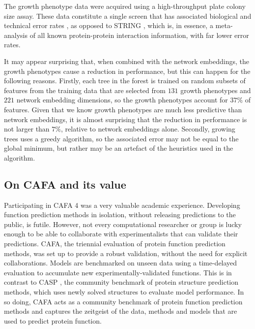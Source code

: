 The growth phenotype data were acquired using a high-throughput plate colony size assay. These data constitute a single screen that has associated biological and technical error rates \cite{Bilder2009}, as opposed to STRING \cite{Szklarczyk2019}, which is, in essence, a meta-analysis of all known protein-protein interaction information, with far lower error rates.

It may appear surprising that, when combined with the network embeddings, the growth phenotypes cause a reduction in performance, but this can happen for the following reasons. Firstly, each tree in the forest is trained on random subsets of features from the training data that are selected from $131$ growth phenotypes and $221$ network embedding dimensions,
so the growth phenotypes account for $37\%$ of features. Given that we know growth phenotypes are much less predictive than network embeddings, it is almost surprising that the reduction in performance is not larger than $7\%$, relative to network embeddings alone. Secondly, growing trees uses a greedy algorithm, so the associated error may not be equal to the global minimum, but rather may be an artefact of the heuristics used in the algorithm.

\subsection{On CAFA and its value}

Participating in CAFA 4 was a very valuable academic experience. Developing function prediction methods in isolation, without releasing predictions to the public, is futile. However, not every computational researcher or group is lucky enough to be able to collaborate with experimentalists that can validate their predictions. CAFA, the triennial evaluation of protein function prediction methods, was set up to provide a robust validation, without the need for explicit collaborations. Models are benchmarked on unseen data using a time-delayed evaluation to accumulate new experimentally-validated functions. This is in contrast to CASP \cite{Kryshtafovych2019}, the community benchmark of protein structure prediction methods, which uses newly solved structures to evaluate model performance. In so doing, CAFA acts as a community benchmark of protein function prediction methods and captures the zeitgeist of the data, methods and models that are used to predict protein function.

